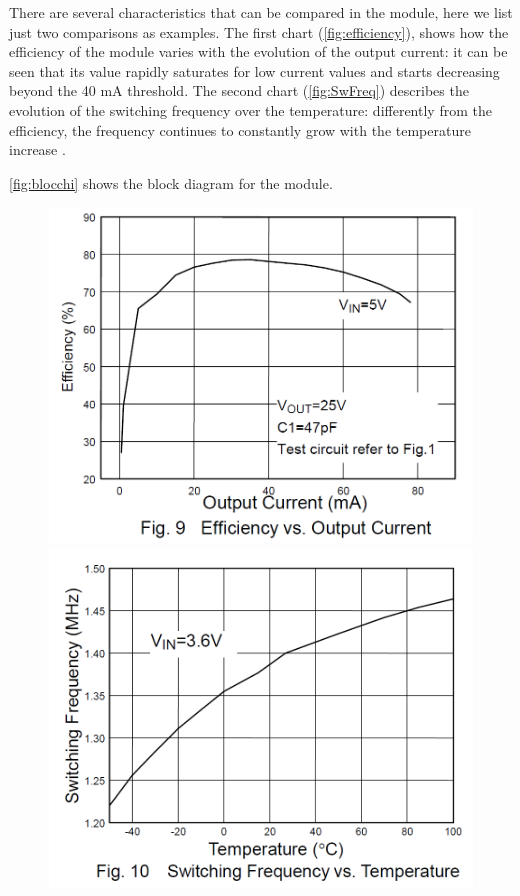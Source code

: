 \documentclass[11pt,a4paper,titlepage]{article}
\begin{document}
\begin{description}
				  There are several characteristics that can be compared in the module, here we list just two comparisons as examples. The first chart (\autoref{fig:efficiency}), shows how the efficiency of the module varies with the evolution of the output current: it can be seen that its value rapidly saturates for low current values and starts decreasing beyond the 40 mA threshold. The second chart (\autoref{fig:SwFreq}) describes the evolution of the switching frequency over the temperature: differently from the efficiency, the frequency continues to constantly grow with the temperature increase \cite{stepupConv}.

				  \autoref{fig:blocchi} shows the block diagram for the module.

				  \begin{figure}
						\begin{minipage}{.5\textwidth}
						\includegraphics[width = \textwidth]{efficiencyVScurrent.png}
						\caption{}
						\label{fig:efficiency}
						\end{minipage}
						\hspace{5mm}
						\begin{minipage}{.5\textwidth}
						\includegraphics[width = \textwidth]{frequencyVStemp.png}

\end{minipage}
\end{figure}
\end{description}
\end{document}
